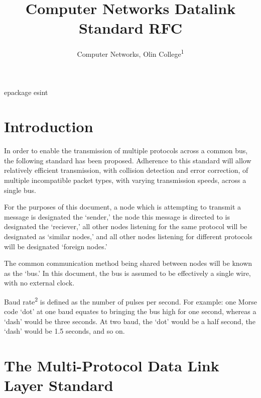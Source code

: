epackage{ esint }
\usepackage{wrapfig}
\usepackage[margin=1in, paperwidth=8.5in, paperheight=11in]{geometry}

\title{Computer Networks Datalink Standard RFC}
\author{Computer Networks, Olin College\textsuperscript{1}}




\maketitle

\section{Introduction}

In order to enable the transmission of multiple protocols across a common bus, the following standard has been proposed. Adherence to this standard will allow relatively efficient transmission, with collision detection and error correction, of multiple incompatible packet types, with varying transmission speeds, across a single bus.

For the purposes of this document, a node which is attempting to transmit a message is designated the `sender,' the node this message is directed to is designated the `reciever,' all other nodes listening for the same protocol will be designated as `similar nodes,' and all other nodes listening for different protocols will be designated `foreign nodes.'

The common communication method being shared between nodes will be known as the `bus.' In this document, the bus is assumed to be effectively a single wire, with no external clock.

Baud rate\textsuperscript{2} is defined as the number of pulses per second. For example: one Morse code `dot' at one baud equates to bringing the bus high for one second, whereas a `dash' would be three seconds. At two baud, the `dot' would be a half second, the `dash' would be 1.5 seconds, and so on.


\section{The Multi-Protocol Data Link Layer Standard}

